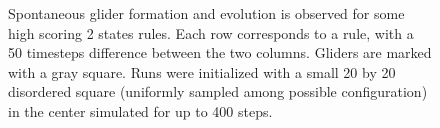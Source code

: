 \begin{figure}[t]
  \centering
  \hfil
  \hfil\setcounter{subfigure}{0} %
  \hfil
  \caption{Spontaneous glider formation and evolution is observed for some high
    scoring 2 states rules. Each row corresponds to a rule, with a 50 timesteps
    difference between the two columns. Gliders are marked with a gray square.
    Runs were initialized with a small 20 by 20 disordered square (uniformly
    sampled among possible configuration) in the center simulated for up to 400
    steps.}
  \label{fig:automat_glider}
\end{figure}

